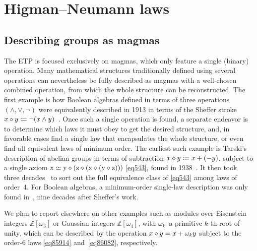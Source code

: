 \section{Higman--Neumann laws}\label{higman-neumann}

\subsection{Describing groups as magmas}

The ETP is focused exclusively on magmas, which only feature a single (binary) operation.  Many mathematical structures traditionally defined using several operations can nevertheless be fully described as magmas with a well-chosen combined operation, from which the whole structure can be reconstructed.  The first example is how Boolean algebras defined in terms of three operations $(\land,\lor,\lnot)$ were equivalently described in 1913 in terms of the Sheffer stroke $x\diamond y\coloneqq \lnot(x\land y)$~\cite{sheffer}.  Once such a single operation is found, a separate endeavor is to determine which laws it must obey to get the desired structure, and, in favorable cases find a single law that encapsulates the whole structure, or even find all equivalent laws of minimum order.  The earliest such example is Tarski's description of abelian groups in terms of subtraction $x\diamond y\coloneqq x+(-y)$, subject to a single axiom $\mathrm{x} \simeq \mathrm{y} \diamond (\mathrm{z} \diamond (\mathrm{x} \diamond (\mathrm{y} \diamond \mathrm{z})))$ \eqref{eq543}, found in 1938~\cite{Tarski1938}.  It then took three decades~\cite{higman-neumann,Sholander01021959,Padmanabhan_1969} to sort out the full equivalence class of \eqref{eq543} among laws of order~$4$.  For Boolean algebras, a minimum-order single-law description was only found in~\cite{mccune_et_al}, nine decades after Sheffer's work.

We plan to report elsewhere on other examples such as modules over Eisenstein integers $\mathbb{Z}[\omega_3]$ or Gaussian integers $\mathbb{Z}[\omega_4]$, with $\omega_k$~a primitive $k$-th root of unity, which can be described by the operation $x \diamond y = x + \omega_k y$ subject to the order-$6$ laws \eqref{eq85914} and~\eqref{eq86082}, respectively.

